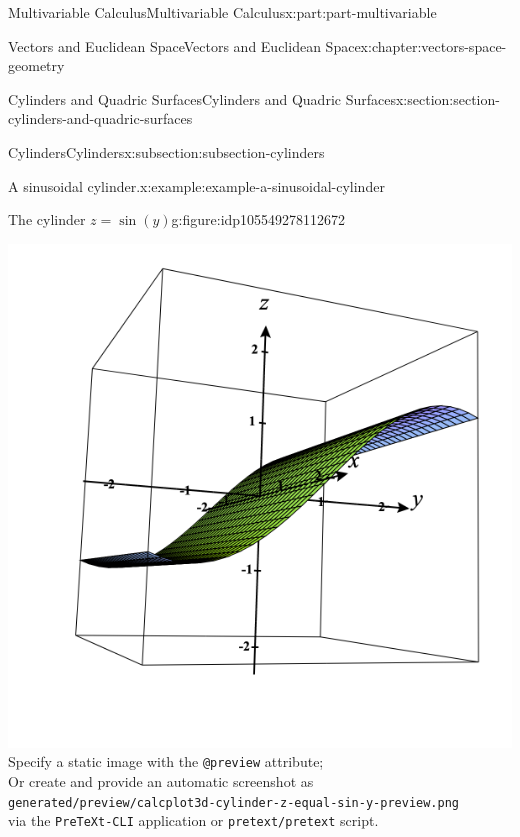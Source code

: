 \documentclass[twoside,10pt,]{book}
\newcommand{\mono}[1]{\texttt{#1}}
\numberwithin{equation}{part}
\newlength{\qrsize}
\newlength{\previewwidth}
\begin{document}
\begin{partptx}{Multivariable Calculus}{}{Multivariable Calculus}{}{}{x:part:part-multivariable}
\begin{chapterptx}{Vectors and Euclidean Space}{}{Vectors and Euclidean Space}{}{}{x:chapter:vectors-space-geometry}
\begin{sectionptx}{Cylinders and Quadric Surfaces}{}{Cylinders and Quadric Surfaces}{}{}{x:section:section-cylinders-and-quadric-surfaces}
\begin{subsectionptx}{Cylinders}{}{Cylinders}{}{}{x:subsection:subsection-cylinders}
\begin{example}{A sinusoidal cylinder.}{x:example:example-a-sinusoidal-cylinder}
\end{example}
\begin{figureptx}{The cylinder \(z=\sin(y)\)}{g:figure:idp105549278112672}{}%
\centering
\setlength{\qrsize}{9em}
\setlength{\previewwidth}{\linewidth}
\addtolength{\previewwidth}{-\qrsize}
\begin{tcbraster}[raster columns=2, raster column skip=1pt, raster halign=center, raster force size=false, raster left skip=0pt, raster right skip=0pt]%
\begin{tcolorbox}[previewstyle, width=\previewwidth]%
%
{\includegraphics[width=0.80\linewidth,height=\qrsize,keepaspectratio]{generated/preview/calcplot3d-cylinder-z-equal-sin-y-preview.png}}%
{\small{}Specify a static image with the \mono{@preview} attribute;\\%
Or create and provide an automatic screenshot as\\%
\mono{generated/preview/calcplot3d-cylinder-z-equal-sin-y-preview.png}\\%
via the \mono{PreTeXt-CLI} application or \mono{pretext/pretext} script.}%
\end{tcolorbox}%
\begin{tcolorbox}[qrstyle]%
{\hypersetup{urlcolor=black}}%
\end{tcolorbox}%
\end{tcbraster}%
\tcblower
\end{figureptx}%

\end{subsectionptx}
\end{sectionptx}
\end{chapterptx}
\end{partptx}
\end{document}
